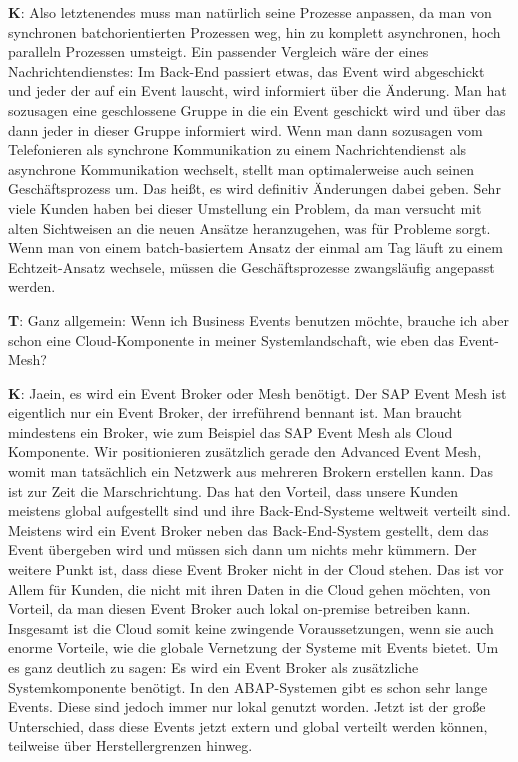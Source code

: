 \begin{list}{X:}{\setlength{\labelsep}{5mm}}
 \item[\textbf{K}:] Also letztenendes muss man natürlich seine Prozesse anpassen, da man von synchronen batchorientierten Prozessen weg, hin zu komplett asynchronen, hoch paralleln Prozessen umsteigt. Ein passender Vergleich wäre der eines Nachrichtendienstes: Im Back-End passiert etwas, das Event wird abgeschickt und jeder der auf ein Event lauscht, wird informiert über die Änderung. Man hat sozusagen eine geschlossene Gruppe in die ein Event geschickt wird und über das dann jeder in dieser Gruppe informiert wird. Wenn man dann sozusagen vom Telefonieren als synchrone Kommunikation zu einem Nachrichtendienst als asynchrone Kommunikation wechselt, stellt man optimalerweise auch seinen Geschäftsprozess um. Das hei{\ss}t, es wird definitiv Änderungen dabei geben. Sehr viele Kunden haben bei dieser Umstellung ein Problem, da man versucht mit alten Sichtweisen an die neuen Ansätze heranzugehen, was für Probleme sorgt. Wenn man von einem batch-basiertem Ansatz der einmal am Tag läuft zu einem Echtzeit-Ansatz wechsele, müssen die Geschäftsprozesse zwangsläufig angepasst werden.
 \item[\textbf{T}:] Ganz allgemein: Wenn ich Business Events benutzen möchte, brauche ich aber schon eine Cloud-Komponente in meiner Systemlandschaft, wie eben das Event-Mesh?
 \item[\textbf{K}:] Jaein, es wird ein Event Broker oder Mesh benötigt. Der SAP Event Mesh ist eigentlich nur ein Event Broker, der irreführend bennant ist. Man braucht mindestens ein Broker, wie zum Beispiel das SAP Event Mesh als Cloud Komponente. Wir positionieren zusätzlich gerade den Advanced Event Mesh, womit man tatsächlich ein Netzwerk aus mehreren Brokern erstellen kann. Das ist zur Zeit die Marschrichtung. Das hat den Vorteil, dass unsere Kunden meistens global aufgestellt sind und ihre Back-End-Systeme weltweit verteilt sind. Meistens wird ein Event Broker neben das Back-End-System gestellt, dem das Event übergeben wird und müssen sich dann um nichts mehr kümmern. Der weitere Punkt ist, dass diese Event Broker nicht in der Cloud stehen. Das ist vor Allem für Kunden, die nicht mit ihren Daten in die Cloud gehen möchten, von Vorteil, da man diesen Event Broker auch lokal on-premise betreiben kann. Insgesamt ist die Cloud somit keine zwingende Voraussetzungen, wenn sie auch enorme Vorteile, wie die globale Vernetzung der Systeme mit Events bietet. Um es ganz deutlich zu sagen: Es wird ein Event Broker als zusätzliche Systemkomponente benötigt. In den ABAP-Systemen gibt es schon sehr lange Events. Diese sind jedoch immer nur lokal genutzt worden. Jetzt ist der gro{\ss}e Unterschied, dass diese Events jetzt extern und global verteilt werden können, teilweise über Herstellergrenzen hinweg.

\end{list}
